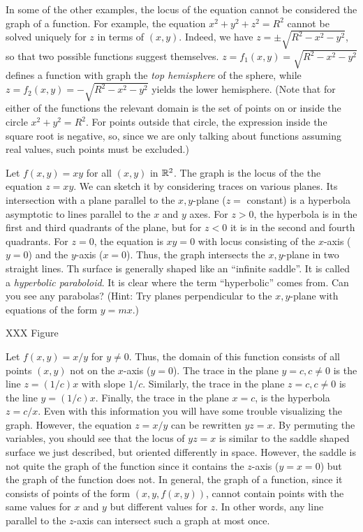 In some of the other examples, the locus
of the equation cannot be considered the graph of a function.
For example, the equation $x^2 + y^2 + z^2 = R^2$ cannot be solved
uniquely for $z$ in terms of $(x,y)$.  Indeed, we have
$z = \pm\sqrt{R^2 - x^2 - y^2}$, so that two possible functions
suggest themselves.  $z = f_1(x,y) = \sqrt{R^2 - x^2 - y^2}$ 
defines a function with graph
the \emph{top hemisphere} of the sphere, while $z = f_2(x,y)
= - \sqrt{R^2 - x^2 - y^2}$ yields the lower hemisphere.  (Note that
for either of the functions the relevant domain is the set of
points on or inside the circle $x^2 + y^2 = R^2$.  For points outside
that circle, the expression inside the square root is negative, so,
since we are only talking about functions assuming real values,
such points must be excluded.)

\begin{example}
	Let $f(x,y) = xy$ for all $(x,y)$ in $\mathbb{R}^2$.    The graph is the
	locus of the the equation $z = xy$.  We can sketch it by considering
	traces on various planes.  Its intersection with a plane parallel
	to the $x,y$-plane ($z =$ constant) is a hyperbola asymptotic to
	lines parallel to the $x$ and $y$ axes.   For $z > 0$, the hyperbola
	is in the first and third quadrants of the plane, but for
	$z < 0$ it is in the second and fourth quadrants.  For $z = 0$,
	the equation is $xy = 0$ with locus consisting of the $x$-axis
	($y = 0$) and the $y$-axis ($x = 0$).   Thus, the graph intersects
	the $x,y$-plane in two straight lines.  Th surface is generally
	shaped like an ``infinite saddle''.  It is called a {\it hyperbolic
	paraboloid}.  It is clear where the term ``hyperbolic'' comes from.
	Can you see any parabolas?  (Hint: Try planes perpendicular to
	the $x,y$-plane with equations of the form  $y = mx$.)

	XXX Figure
\end{example}

\begin{example}
	 Let $f(x,y) = x/y$ for $y \not= 0$.  Thus, the domain of this
	function consists of all points $(x,y)$ not on the $x$-axis
	($y = 0$).
	The trace in the plane $y = c, c \not= 0$ is the line $z = (1/c)x$
	with slope $1/c$.   Similarly, the trace in the plane $z = c, c \not=0$
	is the line $y = (1/c)x$.  Finally, the trace in the plane $x = c$,
	is the hyperbola $z = c/x$.  Even with this information you will have
	some trouble visualizing the graph.   However, the equation
	$z = x/y$ can be rewritten $yz = x$.   By permuting the variables,
	you should see that the locus of $yz = x$
	 is similar to the  saddle shaped surface
	we just described, but oriented differently in space.  However,
	 the saddle
	is not quite the graph of the function since it  contains the 
	 $z$-axis ($y = x = 0$) but the graph of the function does not.
	In general, the graph of a function, since it consists of points
	of the form $(x,y,f(x,y))$, cannot contain points with the same
	values for $x$ and $y$ but different values for $z$.  In other words,
	any line parallel to the $z$-axis can intersect such a graph at most
	once. 
\end{example}

